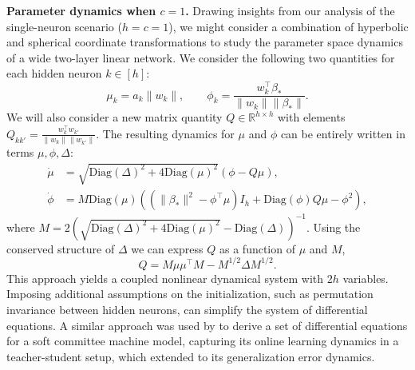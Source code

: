 \documentclass{article}
\theoremstyle{plain}
\theoremstyle{definition}
\theoremstyle{remark}
\begin{document}
\textbf{Parameter dynamics when $c = 1$.}
%
Drawing insights from our analysis of the single-neuron scenario ($h = c = 1$), we might consider a combination of hyperbolic and spherical coordinate transformations to study the parameter space dynamics of a wide two-layer linear network.
%
We consider the following two quantities for each hidden neuron $k \in [h]$:
\begin{equation}
    \mu_k = a_k\|w_k\|, \qquad \phi_k = \frac{w_k^\intercal \beta_*}{\|w_k\|\|\beta_*\|}.
\end{equation}
We will also consider a new matrix quantity $Q \in \mathbb{R}^{h\times h}$ with elements $Q_{kk'} = \frac{w_k^\intercal w_{k'}}{\|w_k\|\|w_{k'}\|}$.
%
The resulting dynamics for $\mu$ and $\phi$ can be entirely written in terms $\mu, \phi, \Delta$:
\begin{align}
    \dot{\mu} &= \sqrt{\mathrm{Diag}(\Delta)^2 + 4\mathrm{Diag}(\mu)^2}\left(\phi - Q\mu\right),\\
    \dot{\phi} &= M\mathrm{Diag}(\mu)\left((\|\beta_*\|^2 - \phi^\intercal \mu)I_h + \mathrm{Diag}(\phi)Q\mu - \phi^2\right),
\end{align}
where $M = 2\left(\sqrt{\mathrm{Diag}(\Delta)^2 + 4 \mathrm{Diag}(\mu)^2} - \mathrm{Diag}(\Delta)\right)^{-1}$.
%
Using the conserved structure of $\Delta$ we can express $Q$ as a function of $\mu$ and $M$,
\begin{equation}
    Q = M \mu \mu^\intercal M - M^{1/2}\Delta M^{1/2}.
\end{equation}
This approach yields a coupled nonlinear dynamical system with $2h$ variables.
%
Imposing additional assumptions on the initialization, such as permutation invariance between hidden neurons, can simplify the system of differential equations.
%
A similar approach was used by \citet{saad1995exact} to derive a set of differential equations for a soft committee machine model, capturing its online learning dynamics in a teacher-student setup, which \citet{goldt2019generalisation} extended to its generalization error dynamics.
\end{document}
